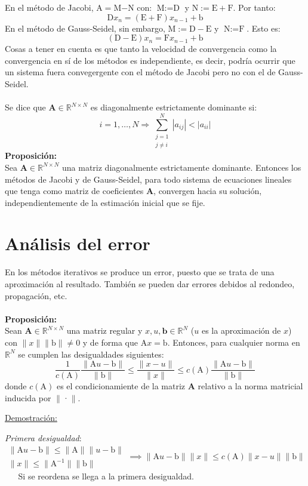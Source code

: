 \documentclass{article}
\begin{document}
En el método de Jacobi, A$=$M$-$N con: $\text{M}:=\text{D}$ y $\text{N}:=\text{E}+\text{F}$. Por tanto:
$$\text{D}x_n=(\text{E}+\text{F})x_{n-1}+\text{b}$$
En el método de Gauss-Seidel, sin embargo, $\text{M}:=\text{D}-\text{E}$ y $\text{N}:=\text{F}$. Esto es:
$$(\text{D}-\text{E})x_n=\text{F}x_{n-1}+\text{b}$$
Cosas a tener en cuenta es que tanto la velocidad de convergencia como la convergencia en sí de los métodos es independiente, es decir, podría ocurrir que un sistema fuera convegergente con el método de Jacobi pero no con el de Gauss-Seidel.
\\
\\
Se dice que $\textbf{A}\in\mathbb{R}^{N\times N}$ es diagonalmente estrictamente dominante si:
$$i=1,\dots,N\Rightarrow\sum_{\substack{
j=1 \\
j\neq i
}}^N|a_{ij}|<|a_{ii}|$$
\textbf{Proposición:}
\\
Sea $\textbf{A}\in\mathbb{R}^{N\times N}$ una matriz diagonalmente estrictamente dominante. Entonces los métodos de Jacobi y de Gauss-Seidel, para todo sistema de ecuaciones lineales que tenga como matriz de coeficientes \textbf{A}, convergen hacia su solución, independientemente de la estimación inicial que se fije.
%
%
\section{Análisis del error}
En los métodos iterativos se produce un error, puesto que se trata de una aproximación al resultado. También se pueden dar errores debidos al redondeo, propagación, etc.
\\
\\
\textbf{Proposición:}
\\
Sean $\textbf{A}\in\mathbb{R}^{N\times N}$ una matriz regular y $x,u,\textbf{b}\in\mathbb{R}^N$ ($u$ es la aproximación de $x$) con $\|x\|\|\text{b}\|\neq 0$ y de forma que $\text{A}x=\text{b}$. Entonces, para cualquier norma en $\mathbb{R}^N$ se cumplen las desigualdades siguientes:
$$\frac{1}{c(\text{A})}\frac{\|\text{A}u-\text{b}\|}{\|\text{b}\|}\leq\frac{\|x-u\|}{\|x\|}\leq c(\text{A})\frac{\|\text{A}u-\text{b}\|}{\|\text{b}\|}$$
donde $c(\text{A})$ es el condicionamiente de la matriz \textbf{A} relativo a la norma matricial inducida por $\|$·$\|$.

\hrulefill

\underline{Demostración:}

\emph{Primera desigualdad}:
$$\begin{matrix}
\|\text{A}u-\text{b}\|\leq\|\text{A}\|\|u-\text{b}\| \\
\|x\|\leq\|\text{A}^{-1}\|\|\text{b}\|
\end{matrix}\implies\|\text{A}u-\text{b}\|\|x\|\leq c(\text{A})\|x-u\|\|\text{b}\|$$
$\quad\;$ Si se reordena se llega a la primera desigualdad.
\end{document}
